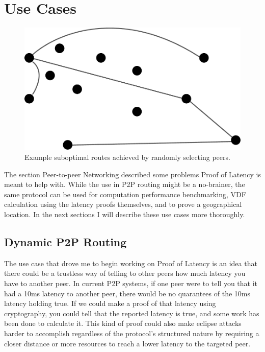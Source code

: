 \section{Use Cases}
\begin{figure}
  \includegraphics[width=\textwidth]{pictures/random_routing.pdf}
  \caption{Example suboptimal routes achieved by randomly selecting peers.}
  \label{Subobtimal Topology}
\end{figure}
The section Peer-to-peer Networking described some problems Proof of Latency is meant to help with. While the use in P2P routing might be a no-brainer, the same protocol can be used for computation performance benchmarking, VDF calculation using the latency proofs themselves, and to prove a geographical location. In the next sections I will describe these use cases more thoroughly.

\subsection{Dynamic P2P Routing}
The use case that drove me to begin working on Proof of Latency is an idea that there could be a trustless way of telling to other peers how much latency you have to another peer. In current P2P systems, if one peer were to tell you that it had a 10ms latency to another peer, there would be no quarantees of the 10ms latency holding true. If we could make a proof of that latency using cryptography, you could tell that the reported latency is true, and some work has been done to calculate it. This kind of proof could also make eclipse attacks harder to accomplish regardless of the protocol's structured nature by requiring a closer distance or more resources to reach a lower latency to the targeted peer.


